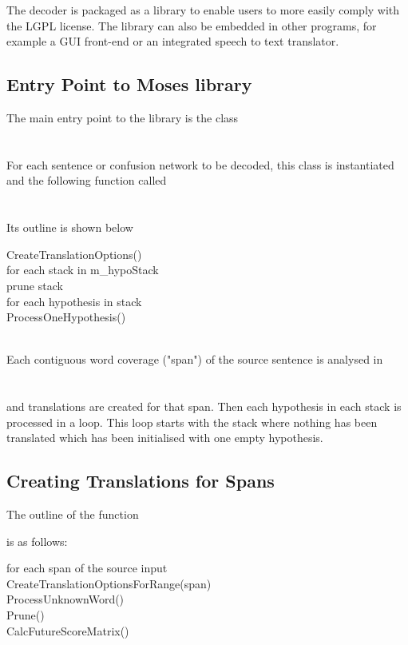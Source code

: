 \documentclass[11pt]{report}
\theoremstyle{plain}
\begin{document}
{The decoder is packaged as a library to enable users to more easily comply with the LGPL license. The library can also be embedded in other programs, for example a GUI front-end or an integrated speech to text translator.

\subsection{Entry Point to Moses library}

The main entry point to the library is the class\\
\\
\\
For each sentence or confusion network to be decoded, this class is instantiated and the following function called\\
\\
\\
Its outline is shown below\\
\begin{tt}
\indent CreateTranslationOptions()\\
\indent for each stack in m\_hypoStack\\
\indent \indent prune stack\\
\indent \indent for each hypothesis in stack\\
\indent \indent \indent ProcessOneHypothesis()\\
\end{tt}\\
Each contiguous word coverage ("span") of the source sentence is analysed in\\ 
\\
\\
and translations are created for that span. Then each hypothesis in each stack is processed in a loop. This loop starts with the stack where nothing has been translated which has been initialised with one empty hypothesis.
\\
\subsection{Creating Translations for Spans}
The outline of the function \\

is as follows:\\
\begin{tt}
\indent	for each span of the source input\\
\indent \indent	CreateTranslationOptionsForRange(span)\\
\indent	ProcessUnknownWord()\\
\indent	Prune()\\
\indent	CalcFutureScoreMatrix()
\end{tt}

}
\end{document}
